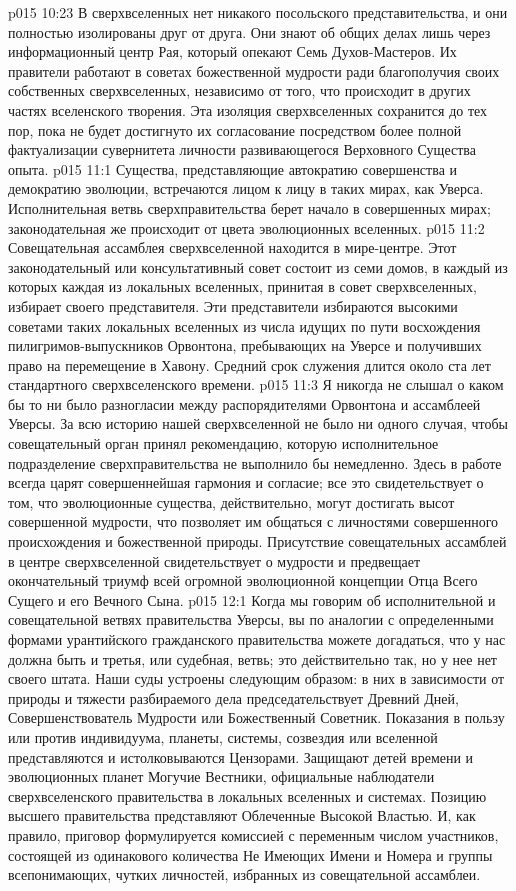 \vs p015 10:23 В сверхвселенных нет никакого посольского представительства, и они полностью изолированы друг от друга. Они знают об общих делах лишь через информационный центр Рая, который опекают Семь Духов\hyp{}Мастеров. Их правители работают в советах божественной мудрости ради благополучия своих собственных сверхвселенных, независимо от того, что происходит в других частях вселенского творения. Эта изоляция сверхвселенных сохранится до тех пор, пока не будет достигнуто их согласование посредством более полной фактуализации сувернитета личности развивающегося Верховного Существа опыта.
\vs p015 11:1 Существа, представляющие автократию совершенства и демократию эволюции, встречаются лицом к лицу в таких мирах, как Уверса. Исполнительная ветвь сверхправительства берет начало в совершенных мирах; законодательная же происходит от цвета эволюционных вселенных.
\vs p015 11:2 Совещательная ассамблея сверхвселенной находится в мире\hyp{}центре. Этот законодательный или консультативный совет состоит из семи домов, в каждый из которых каждая из локальных вселенных, принитая в совет сверхвселенных, избирает своего представителя. Эти представители избираются высокими советами таких локальных вселенных из числа идущих по пути восхождения пилигримов\hyp{}выпускников Орвонтона, пребывающих на Уверсе и получивших право на перемещение в Хавону. Средний срок служения длится около ста лет стандартного сверхвселенского времени.
\vs p015 11:3 Я никогда не слышал о каком бы то ни было разногласии между распорядителями Орвонтона и ассамблеей Уверсы. За всю историю нашей сверхвселенной не было ни одного случая, чтобы совещательный орган принял рекомендацию, которую исполнительное подразделение сверхправительства не выполнило бы немедленно. Здесь в работе всегда царят совершеннейшая гармония и согласие; все это свидетельствует о том, что эволюционные существа, действительно, могут достигать высот совершенной мудрости, что позволяет им общаться с личностями совершенного происхождения и божественной природы. Присутствие совещательных ассамблей в центре сверхвселенной свидетельствует о мудрости и предвещает окончательный триумф всей огромной эволюционной концепции Отца Всего Сущего и его Вечного Сына.
\vs p015 12:1 Когда мы говорим об исполнительной и совещательной ветвях правительства Уверсы, вы по аналогии с определенными формами урантийского гражданского правительства можете догадаться, что у нас должна быть и третья, или судебная, ветвь; это действительно так, но у нее нет своего штата. Наши суды устроены следующим образом: в них в зависимости от природы и тяжести разбираемого дела председательствует Древний Дней, Совершенствователь Мудрости или Божественный Советник. Показания в пользу или против индивидуума, планеты, системы, созвездия или вселенной представляются и истолковываются Цензорами. Защищают детей времени и эволюционных планет Могучие Вестники, официальные наблюдатели сверхвселенского правительства в локальных вселенных и системах. Позицию высшего правительства представляют Облеченные Высокой Властью. И, как правило, приговор формулируется комиссией с переменным числом участников, состоящей из одинакового количества Не Имеющих Имени и Номера и группы всепонимающих, чутких личностей, избранных из совещательной ассамблеи.

